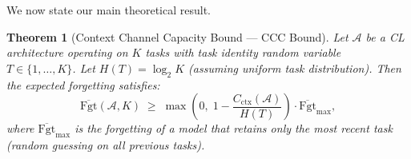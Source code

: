 \documentclass{article}
\newtheorem{theorem}{Theorem}
\begin{document}
We now state our main theoretical result.

\begin{theorem}[Context Channel Capacity Bound --- CCC Bound]
\label{thm:ccc}
Let $\mathcal{A}$ be a CL architecture operating on $K$ tasks with task identity random variable $T \in \{1, \ldots, K\}$. Let $H(T) = \log_2 K$ (assuming uniform task distribution). Then the expected forgetting satisfies:
\begin{equation}
\label{eq:ccc_bound}
    \overline{\mathrm{Fgt}}(\mathcal{A}, K) \;\geq\; \max\!\left(0,\; 1 - \frac{C_\mathrm{ctx}(\mathcal{A})}{H(T)}\right) \cdot \overline{\mathrm{Fgt}}_\mathrm{max},
\end{equation}
where $\overline{\mathrm{Fgt}}_\mathrm{max}$ is the forgetting of a model that retains only the most recent task (random guessing on all previous tasks).
\end{theorem}
\end{document}
